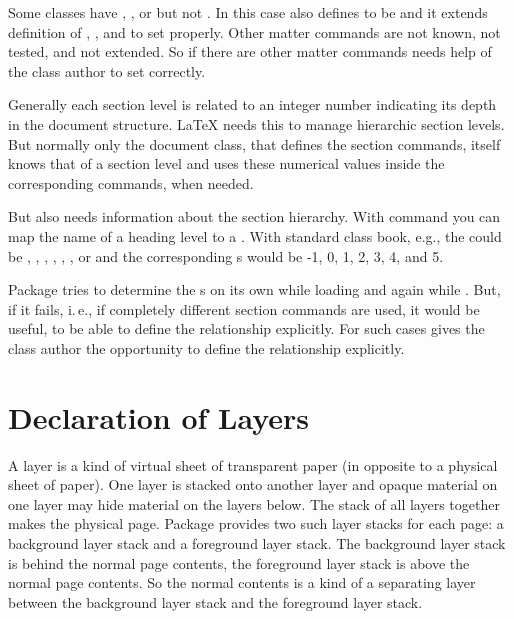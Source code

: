 Some classes have , , or
 but not . In this case
 also defines  to be 
and it extends definition of , , and
 to set  properly. Other matter
commands are not known, not tested, and not extended. So if there are other
matter commands  needs help of the class author to set
 correctly.%

\begin{Declaration}
\end{Declaration}
%
Generally each section level is related to an integer number indicating its
depth in the document structure. \LaTeX{} needs this to manage hierarchic
section levels. But normally only the document class, that defines the section
commands, itself knows that  of a section level and uses
these numerical values inside the corresponding commands, when needed.

But  also needs information about the section hierarchy.
With command  you can map
the name of a heading level to a . With standard class
book, e.g., the  could be , ,
, , ,
, or  and the corresponding
s would be -1, 0, 1, 2, 3, 4, and 5. 

Package  tries to determine the s on its
own while loading and again while . But, if
it fails, i.\,e., if completely different section commands are used, it would
be useful, to be able to define the relationship explicitly. For such cases
 gives the class author the opportunity to
define the relationship explicitly.%

\section{Declaration of Layers}
\label{sec:scrlayer.layers}

A layer is a kind of virtual sheet of transparent paper (in opposite to a
physical sheet of paper). One layer is stacked onto another layer and opaque
material on one layer may hide material on the layers below. The stack of all
layers together makes the physical page. Package 
provides two such layer stacks for each page: a background layer stack and a
foreground layer stack. The background layer stack is behind the normal page
contents, the foreground layer stack is above the normal page contents. So the
normal contents is a kind of a separating layer between the background layer
stack and the foreground layer stack.

